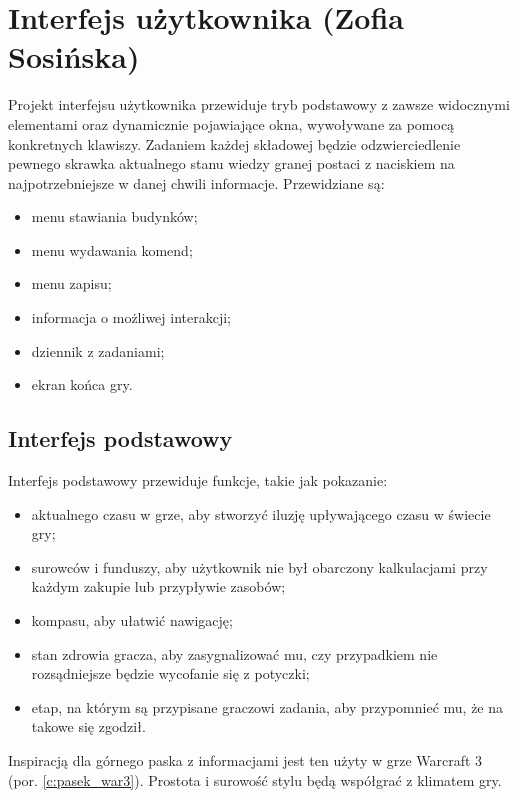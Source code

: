 \section{Interfejs użytkownika (Zofia Sosińska)}\label{chap:ui}
Projekt interfejsu użytkownika przewiduje tryb podstawowy z zawsze widocznymi elementami oraz dynamicznie pojawiające okna, wywoływane za pomocą konkretnych klawiszy. 
 Zadaniem każdej składowej będzie odzwierciedlenie pewnego skrawka aktualnego stanu wiedzy granej postaci z naciskiem na najpotrzebniejsze w danej chwili informacje. Przewidziane są:
 \begin{itemize}
    \item menu stawiania budynków; 
    \item menu wydawania komend;
    \item menu zapisu;
    \item informacja o możliwej interakcji;
    \item dziennik z zadaniami;
    \item ekran końca gry.
\end{itemize}
	
\subsection{Interfejs podstawowy}
Interfejs podstawowy przewiduje funkcje, takie jak pokazanie:
\begin{itemize}
    \item aktualnego czasu w grze, aby stworzyć iluzję upływającego czasu w świecie gry; 
    \item surowców i funduszy, aby użytkownik nie był obarczony kalkulacjami przy każdym zakupie lub przypływie zasobów;
    \item kompasu, aby ułatwić nawigację;
    \item stan zdrowia gracza, aby zasygnalizować mu, czy przypadkiem nie rozsądniejsze będzie wycofanie się z potyczki;
    \item etap, na którym są przypisane graczowi zadania, aby przypomnieć mu, że na takowe się zgodził.
\end{itemize}
Inspiracją dla górnego paska z informacjami jest ten użyty w grze Warcraft 3 (por. \ref{c:pasek_war3}). Prostota i surowość stylu będą współgrać z klimatem gry.

